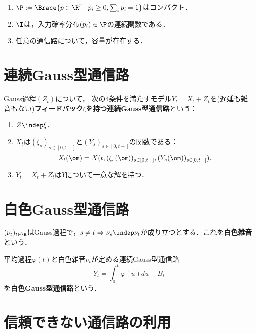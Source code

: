 \documentclass[uplatex,dvipdfmx]{jsreport}
\begin{document}
\begin{theorem}\mbox{}
    \begin{enumerate}
        \item $\P:=\Brace{p\in\R^r\mid p_i\ge 0,\sum_ip_i=1}$はコンパクト．
        \item $\I$は，入力確率分布$(p_i)\in\P$の連続関数である．
        \item 任意の通信路について，容量が存在する．
    \end{enumerate}
\end{theorem}

\section{連続Gauss型通信路}

\begin{model}
    Gauss過程$(Z_t)$について，
    次の4条件を満たすモデル$Y_t=X_t+Z_t$を(遅延も雑音もない)\textbf{フィードバック$\xi$を持つ連続Gauss型通信路}という：
    \begin{enumerate}
        \item $Z\indep\xi$．
        \item $X_t$は$(\xi_s)_{s\in[0,t-]}$と$(Y_s)_{s\in[0,t-]}$の関数である：
        \[X_t(\om)=X(t,(\xi_s(\om))_{s\in[0,t-]},(Y_s(\om))_{s\in[0,t-]}).\]
        \item $Y_t=X_t+Z_t$は$Y$について一意な解を持つ．
    \end{enumerate}
\end{model}

\section{白色Gauss型通信路}

\begin{definition}
    $(\nu_t)_{t\in\R}$はGauss過程で，$s\ne t\Rightarrow\nu_s\indep\nu_t$が成り立つとする．これを\textbf{白色雑音}という．
\end{definition}

\begin{model}
    平均過程$\varphi(t)$と白色雑音$\nu_t$が定める連続Gauss型通信路
    \[Y_t=\int^t_0\varphi(u)du+B_t\]
    を\textbf{白色Gauss型通信路}という．
\end{model}

\section{信頼できない通信路の利用}
\end{document}
